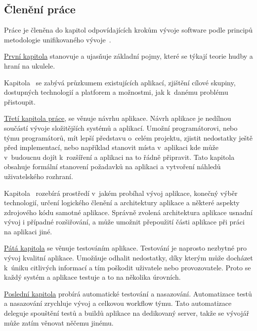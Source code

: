 \begin{introduction}
    \section{Členění práce}
    Práce je členěna do kapitol odpovídajících krokům vývoje software podle principů metodologie unifikovaného vývoje~\cite[s.~51–⁠68]{arlow_2007_uml}.

    \hyperref[ch:glossary]{První kapitola} stanovuje a ujasňuje základní pojmy, které se týkají teorie hudby a hraní na ukulele.

    Kapitola~ se zabývá průzkumem existujících aplikací, zjištění cílové skupiny, dostupných technologií a platforem a možnostmi, jak k~danému problému přistoupit.

    \hyperref[ch:design]{Třetí kapitola práce}, se věnuje návrhu aplikace. Návrh aplikace je nedílnou součástí vývoje složitějších systémů a aplikací. Umožní programátorovi, nebo týmu programátorů, mít lepší představu o~celém projektu, zjistit nedostatky ještě před implementací, nebo například stanovit místa v~aplikaci kde může v~budoucnu dojít k~rozšíření a aplikaci na to řádně připravit. Tato kapitola obsahuje formální stanovení požadavků na aplikaci a vytvoření náhledů uživatelského rozhraní.

    Kapitola~ rozebírá prostředí v~jakém probíhal vývoj aplikace, konečný výběr technologií, určení logického členění a architektury aplikace a některé aspekty zdrojového kódu samotné aplikace. Správně zvolená architektura aplikace usnadní vývoj i případné rozšiřování, a může umožnit přepoužití části aplikace při práci na aplikaci jiné.

    \hyperref[ch:testing]{Pátá kapitola} se věnuje testováním aplikace. Testování je naprosto nezbytné pro vývoj kvalitní aplikace. Umožňuje odhalit nedostatky, díky kterým může docházet k~úniku citlivých informací a tím poškodit uživatele nebo provozovatele. Proto se každý systém a aplikace testuje a to na několika úrovních.

    \hyperref[ch:ci_cd]{Poslední kapitola} probírá automatické testování a nasazování. Automatizace testů a nasazování zrychluje vývoj a celkovou workflow týmu. Tato automatizace deleguje spouštění testů a buildů aplikace na dedikovaný server, takže se vývojář může zatím věnovat něčemu jinému.
\end{introduction}